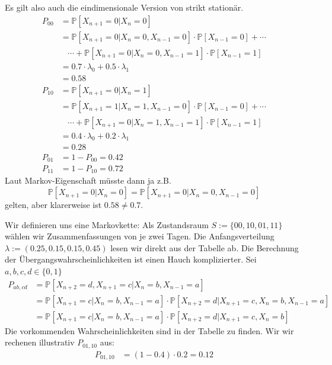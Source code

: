 \documentclass[a4paper,11pt,notitlepage,fullpage]{article}
\newcommand{\pp}[1]{\mathbb P\left[#1\right]}
\begin{document}
\begin{enumerate}
Es gilt also auch die eindimensionale Version von strikt stationär.
\begin{align*}
P_{00} &= \pp{X_{n+1} = 0 | X_n = 0} \\
&= \pp{X_{n+1} = 0 | X_n = 0, X_{n-1} = 0}\cdot\pp{X_{n-1} = 0} + \cdots \\
&~~~~\cdots + \pp{X_{n+1} = 0 | X_n = 0, X_{n-1} = 1}\cdot\pp{X_{n-1} = 1} \\
&= 0.7 \cdot \lambda_0 + 0.5 \cdot \lambda_1 \\
&= 0.58 \\
P_{10} &= \pp{X_{n+1} = 0 | X_n = 1} \\
&= \pp{X_{n+1} = 1 | X_n = 1, X_{n-1} = 0}\cdot\pp{X_{n-1} = 0} + \cdots \\
&~~~~\cdots + \pp{X_{n+1} = 0 | X_n = 1, X_{n-1} = 1}\cdot\pp{X_{n-1} = 1} \\
&= 0.4 \cdot \lambda_0 + 0.2 \cdot \lambda_1 \\
&= 0.28 \\
P_{01} &= 1 - P_{00} = 0.42 \\
P_{11} &= 1 - P_{10} = 0.72
\end{align*}
Laut Markov-Eigenschaft müsste dann ja z.B. $$\pp{X_{n+1} = 0 | X_n = 0} = \pp{X_{n+1} = 0 | X_n = 0, X_{n-1} = 0}$$ gelten, aber klarerweise ist $0.58 \neq 0.7$.

Wir definieren uns eine Markovkette: Als Zustandsraum $S := \{00, 10, 01, 11\}$ wählen wir Zusammenfassungen von je zwei Tagen. Die Anfangsverteilung $\lambda := (0.25, 0.15, 0.15, 0.45)$ lesen wir direkt aus der Tabelle ab. Die Berechnung der Übergangswahrscheinlichkeiten ist einen Hauch komplizierter. Sei $a, b, c, d \in \{0, 1\}$
\begin{align*}
P_{ab, cd} &= \pp{X_{n+2} = d, X_{n+1} = c | X_n = b, X_{n-1} = a} \\
&= \pp{X_{n+1} = c | X_n = b, X_{n-1} = a} \cdot \pp{X_{n+2} = d | X_{n+1} = c, X_n = b, X_{n-1} = a} \\
&= \pp{X_{n+1} = c | X_n = b, X_{n-1} = a} \cdot \pp{X_{n+2} = d | X_{n+1} = c, X_n = b}
\end{align*}
Die vorkommenden Wahrscheinlichkeiten sind in der Tabelle zu finden. Wir wir rechenen illustrativ $P_{01,10}$ aus:
\begin{align*}
P_{01, 10} &= (1-0.4) \cdot 0.2 = 0.12
\end{align*}


\end{enumerate}
\end{document}
